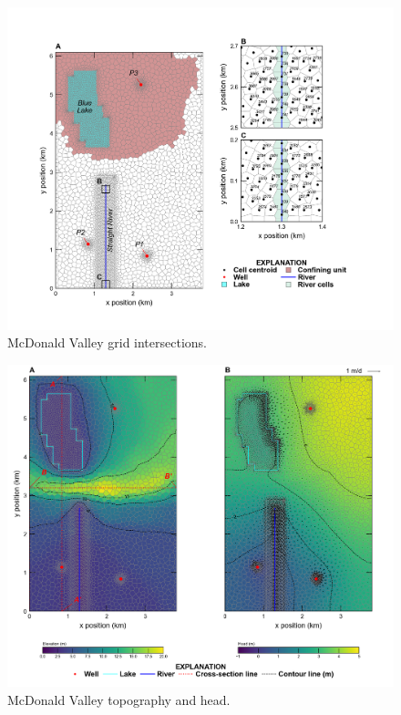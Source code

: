 \documentclass[11pt, oneside]{article}  	%
\begin{document}
\begin{figure}[ht!]
	\begin{center}
		\includegraphics{figures/mv_voronoi_river_discretization.png}
	\end{center}
	\caption{McDonald Valley grid intersections.}
	\label{fig:mvgrid}
\end{figure}


\begin{figure}[ht!]
	\begin{center}
		\includegraphics{figures/mv_voronoi_map.png}
	\end{center}
	\caption{McDonald Valley topography and head.}
	\label{fig:mvmap}
\end{figure}
\end{document}
